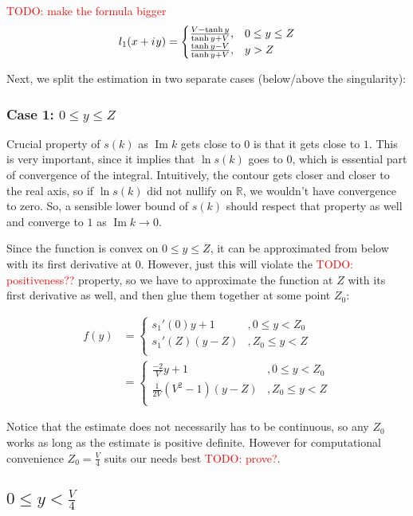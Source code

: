 \documentclass[12pt, a4paper]{article}
\newcommand{\bbR}{\mathbb{R}}
\newcommand{\iu}{{i\mkern1mu}}
\renewcommand{\Im}{\operatorname{Im}}
\newcommand{\todo}[1]{{\large \textcolor{red}{TODO: #1}}}
\begin{document}
\todo{make the formula bigger}
\[
l_1(x + \iu y)
 = \begin{cases}
 \frac{V - \tanh y}{\tanh y + V}, & 0 \le y \le Z \\
 \frac{\tanh y - V}{\tanh y + V}, & y > Z 
 \end{cases}
\]

Next, we split the estimation in two separate cases (below/above the singularity):

\subsubsection*{Case 1: $0 \le y \le Z$}
Crucial property of $s(k)$ as $\Im k$ gets close to $0$ is that it gets close to $1$. This is very important, since it implies that $\ln s(k)$ goes to $0$, which is essential part of convergence of the integral. Intuitively, the contour gets closer and closer to the real axis, so if $\ln s(k)$ did not nullify on $\bbR$, we wouldn't have convergence to zero. So, a sensible lower bound of $s(k)$ should respect that property as well and converge to $1$ as $\Im k \to 0$.

Since the function is convex on $0 \le y \le Z$, it can be approximated from below with its first derivative at $0$. However, just this will violate the \todo{positiveness??} property, so we have to approximate the function at $Z$ with its first derivative as well, and then glue them together at some point $Z_0$:

\begin{align*}
f(y)
& = 
\begin{cases}
s_1'(0) y + 1   &, 0 \le y < Z_0  \\
s_1'(Z) (y - Z) &, Z_0 \le y < Z \\
\end{cases}
\\
& =
\begin{cases}
\frac{-2}{V} y + 1   &, 0 \le y < Z_0  \\
\frac{1}{2 V}(V^2 - 1) (y - Z) &, Z_0 \le y < Z \\
\end{cases}
\end{align*}

Notice that the estimate does not necessarily has to be continuous, so any $Z_0$ works as long as the estimate is positive definite. However for computational convenience $Z_0 = \frac{V}{4}$ suits our needs best \todo{prove?}.

\subsection*{$0 \le y < \frac{V}{4}$}
\end{document}
